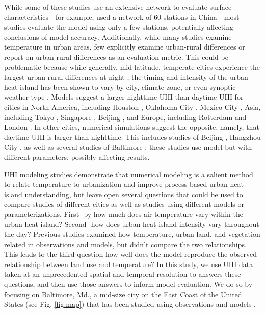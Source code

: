 \documentclass[draft,linenumbers]{agujournal}
\begin{document}
While some of these studies use an extensive network to evaluate surface characteristics---for example, \cite{miao2011impacts} used a network of 60 stations in China---most studies evaluate the model using only a few stations, potentially affecting conclusions of model accuracy. 
Additionally, while many studies examine temperature in urban areas, few explicitly examine urban-rural differences or report on urban-rural differences as an evaluation metric. This could be problematic because while generally, mid-latitude, temperate cities experience the largest urban-rural differences at night \citep{oke82,scott2018reduced}, the timing and intensity of the urban heat island has been shown to vary by city, climate zone, or even synoptic weather type \citep{hardin2017urban}. 
Models suggest a larger nighttime UHI than daytime UHI for cities in North America, including Houston \citep{chen2011numerical}, Oklahoma City \citep{hu2013impact}, Mexico City \citep{cui2012seasonal}, Asia, including Tokyo \citep{kusaka2012urban}, Singapore \citep{li2013multi}, Beijing \citep{wang2013contribution}, and Europe, including Rotterdam \citep{theeuwes2014seasonal} and London \citep{grawe2013modelling}.
In other cities, numerical simulations suggest the opposite, namely, that daytime UHI is larger than nighttime. This includes studies of Beijing \citep{zhang2011impact}, Hangzhou City \citep{chen2014wrf}, as well as several studies of Baltimore \citep{zhang2011impact,li2013synergistic, li2015contrasting}; these studies use model but with different parameters, possibly affecting results. 

UHI modeling studies demonstrate that numerical modeling is a salient method to relate temperature to urbanization and improve process-based urban heat island understanding, but leave open several questions that could be used to compare studies of different cities as well as studies using different models or parameterizations.
 First- by how much does air temperature vary within the urban heat island? Second- how does urban heat island intensity vary throughout the day? Previous studies examined how temperature, urban land, and vegetation related in observations and models, but didn't compare the two relationships. This leads to the third question-how well does the model reproduce the observed relationship between land use and temperature? 
 In this study, 
 we use UHI data taken at an unprecedented spatial and temporal resolution to answers these questions, and then use those answers to inform model evaluation.    
We do so by focusing on Baltimore, Md., a mid-size city on the East Coast of the United States (see Fig. \ref{fig:map}) that has been studied using observations \citep{Huang20111753,scott2017intraurban, scott2018reduced,brazel2000tale} and models \citep{zhang2011impact,li2013development,li2013synergistic,li2015contrasting}.  
\end{document}

